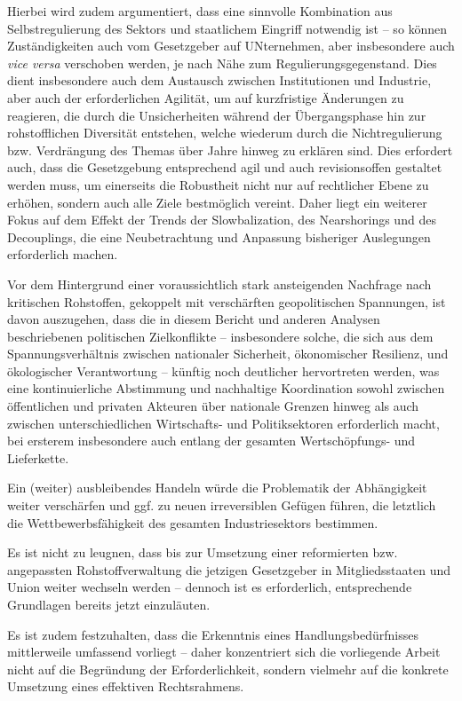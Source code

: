 \documentclass[12pt,a4paper,oneside]{book} %
\begin{document}
Hierbei wird zudem argumentiert, dass eine sinnvolle Kombination aus Selbstregulierung des Sektors und staatlichem Eingriff notwendig ist -- so können Zuständigkeiten auch vom Gesetzgeber auf UNternehmen, aber insbesondere auch \textit{vice versa} verschoben werden, je nach Nähe zum Regulierungsgegenstand. Dies dient insbesondere auch dem Austausch zwischen Institutionen und Industrie, aber auch der erforderlichen Agilität, um auf kurzfristige Änderungen zu reagieren, die durch die Unsicherheiten während der Übergangsphase hin zur rohstofflichen Diversität entstehen, welche wiederum durch die Nichtregulierung bzw. Verdrängung des Themas über Jahre hinweg zu erklären sind. Dies erfordert auch, dass die Gesetzgebung entsprechend agil und auch revisionsoffen gestaltet werden muss, um einerseits die Robustheit nicht nur auf rechtlicher Ebene zu erhöhen, sondern auch alle Ziele bestmöglich vereint. Daher liegt ein weiterer Fokus auf dem Effekt der Trends der Slowbalization, des Nearshorings und des Decouplings, die eine Neubetrachtung und Anpassung bisheriger Auslegungen erforderlich machen.

Vor dem Hintergrund einer voraussichtlich stark ansteigenden Nachfrage nach kritischen Rohstoffen, gekoppelt mit verschärften geopolitischen Spannungen, ist davon auszugehen, dass die in diesem Bericht und anderen Analysen beschriebenen politischen Zielkonflikte -- insbesondere solche, die sich aus dem Spannungsverhältnis zwischen nationaler Sicherheit, ökonomischer Resilienz, und ökologischer Verantwortung -- künftig noch deutlicher hervortreten werden, was eine kontinuierliche Abstimmung und nachhaltige Koordination sowohl zwischen öffentlichen und privaten Akteuren über nationale Grenzen hinweg als auch zwischen unterschiedlichen Wirtschafts- und Politiksektoren erforderlich macht, bei ersterem insbesondere auch entlang der gesamten Wertschöpfungs- und Lieferkette.

Ein (weiter) ausbleibendes Handeln würde die Problematik der Abhängigkeit weiter verschärfen und ggf. zu neuen irreversiblen Gefügen führen, die letztlich die Wettbewerbsfähigkeit des gesamten Industriesektors bestimmen.

Es ist nicht zu leugnen, dass bis zur Umsetzung einer reformierten bzw. angepassten Rohstoffverwaltung die jetzigen Gesetzgeber in Mitgliedsstaaten und Union weiter wechseln werden -- dennoch ist es erforderlich, entsprechende Grundlagen bereits jetzt einzuläuten.

Es ist zudem festzuhalten, dass die Erkenntnis eines Handlungsbedürfnisses mittlerweile umfassend vorliegt -- daher konzentriert sich die vorliegende Arbeit nicht auf die Begründung der Erforderlichkeit, sondern vielmehr auf die konkrete Umsetzung eines effektiven Rechtsrahmens.
\end{document}
